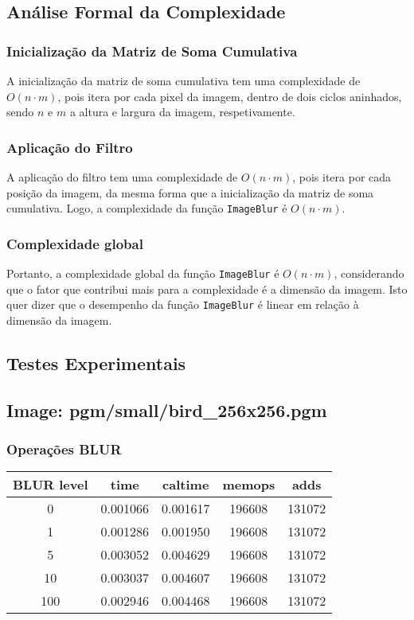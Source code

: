 \documentclass{report}
\begin{document}
\subsection{Análise Formal da Complexidade}

\subsubsection{Inicialização da Matriz de Soma Cumulativa}
A inicialização da matriz de soma cumulativa tem uma complexidade de \(O(n \cdot m)\), pois itera por cada pixel da imagem,
dentro de dois ciclos aninhados, sendo \(n\) e \(m\) a altura e largura da imagem, respetivamente.

\subsubsection{Aplicação do Filtro}
A aplicação do filtro tem uma complexidade de \(O(n \cdot m)\), pois itera por cada posição da imagem, da mesma forma que a inicialização 
da matriz de soma cumulativa. Logo, a complexidade da função \texttt{ImageBlur} é \(O(n \cdot m)\).
\par

\subsubsection{Complexidade global}
Portanto, a complexidade global da função \texttt{ImageBlur} é \(O(n \cdot m)\), considerando que o fator que contribui mais para a complexidade 
é a dimensão da imagem. Isto quer dizer que o desempenho da função \texttt{ImageBlur} é linear em relação à dimensão da imagem.



\subsection{Testes Experimentais}

\subsection*{Image: pgm/small/bird\_256x256.pgm}

\subsubsection*{Operações BLUR}
\begin{tabular}{ccccc}
\toprule
\textbf{BLUR level} & \textbf{time} & \textbf{caltime} & \textbf{memops} & \textbf{adds} \\
\midrule
0 & 0.001066 & 0.001617 & 196608 & 131072 \\
1 & 0.001286 & 0.001950 & 196608 & 131072 \\
5 & 0.003052 & 0.004629 & 196608 & 131072 \\
10 & 0.003037 & 0.004607 & 196608 & 131072 \\
100 & 0.002946 & 0.004468 & 196608 & 131072 \\
\bottomrule
\end{tabular}
\end{document}
